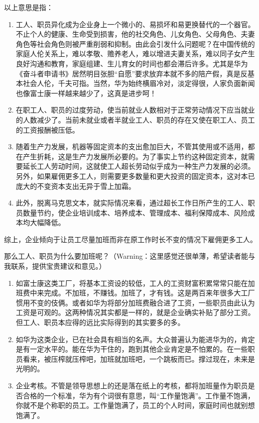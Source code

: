 以上意思是指：
\begin{enumerate}
\item 工人、职员异化成为企业身上一个微小的、易损坏和易更换替代的一个器官。不止个人的健康、生命受到损害，他的社交角色、儿女角色、父母角色、夫妻角色等社会角色则被严重削弱和抑制。由此会引发什么问题呢？在中国传统的家庭人伦关系上，难以孝敬、赡养老人，难以增进夫妻关系，难以同子女产生良好沟通和教育，家庭组建、生儿育女的时间也都会滞后许多。尤其是华为《奋斗者申请书》居然明目张胆“自愿”要求放弃本就不多的陪产假，真是反基本社会人伦，千夫可指。当然，华为始终横眉冷对，淡定得很，人家负面新闻也像富士康一样越来越少了，这真是进步呵！

\item 在职工人、职员的过度劳动，使当前就业人数相对于正常劳动情况下应当就业的人数减少了。当前未就业或者半就业工人、职员的存在又使在职工人、员工的工资报酬被压低。

\item 随着生产力发展，机器等固定资本的支出愈加巨大，不管其使用或不适用，都在产生折耗，这是生产力发展所必要的。为了事实上节约这种固定资本，就需要延长工人劳动时间，这就使工人超长劳动似乎成为一种生产力发展的必须。另外，如果雇佣更多工人，则需要更多数量和更大投资的固定资本，这对本已庞大的不变资本支出无异于雪上加霜。

\item 此外，脱离马克思文本，就实际情况来看，通过超长工作日所产生的工人、职员数量节约，使企业培训成本、培养成本、管理成本、福利保障成本、风险成本均大幅降低。

\end{enumerate}

综上，企业倾向于让员工尽量加班而非在原工作时长不变的情况下雇佣更多工人。

那么工人、职员为什么要加班呢？（Warning：这里感觉还很单薄，希望读者能与我联系，提供宝贵建议和意见。）
\begin{enumerate}

\item 如富士康这类工厂，将基本工资设的较低，工人的工资财富积累常常只能在加班费中来完成。不加班，不赚钱。加班了，才有钱。这是两百来年很多大工厂惯用不变的伎俩。或者如华为将部分加班费融合进了工资，一些职员由此认为工资是可观的。这两种情况其实都是一样的，就是企业确实补贴了部分工资。但工人、职员本应得的远比实际得到的其实要多的多。

\item 如华为这类企业，已在社会具有相当的名声。大众普遍认为能进华为的，肯定是有一定水平的。能在华为干住的，跑到其他企业肯定是不怕累的。在一些职员看来，被压榨就压榨吧，加班就加班吧，一个跳板而已。撑过现在，未来是光明的。

\item 企业考核。不管是领导思想上的还是落在纸上的考核，都将加班量作为职员是否合格的一个标准，华为有个词很有意思，叫“工作量饱满”。工作量不饱满，你就不是个称职的员工。工作量饱满了，员工的个人时间，家庭时间也就别想饱满了。

\end{enumerate}

